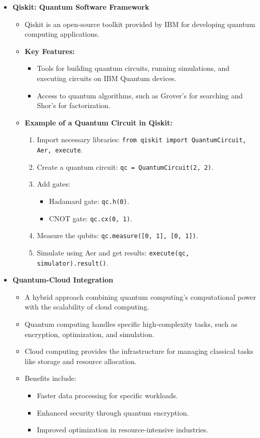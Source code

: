 \documentclass[12pt,a4paper]{article}
\begin{document}
\begin{itemize}
    \item \textbf{Qiskit: Quantum Software Framework}
    \begin{itemize}
        \item Qiskit is an open-source toolkit provided by IBM for developing quantum computing applications.
        \item \textbf{Key Features:}
        \begin{itemize}
            \item Tools for building quantum circuits, running simulations, and executing circuits on IBM Quantum devices.
            \item Access to quantum algorithms, such as Grover's for searching and Shor's for factorization.
        \end{itemize}
        \item \textbf{Example of a Quantum Circuit in Qiskit:}
        \begin{enumerate}
            \item Import necessary libraries: \texttt{from qiskit import QuantumCircuit, Aer, execute}.
            \item Create a quantum circuit: \texttt{qc = QuantumCircuit(2, 2)}.
            \item Add gates:
            \begin{itemize}
                \item Hadamard gate: \texttt{qc.h(0)}.
                \item CNOT gate: \texttt{qc.cx(0, 1)}.
            \end{itemize}
            \item Measure the qubits: \texttt{qc.measure([0, 1], [0, 1])}.
            \item Simulate using Aer and get results: \texttt{execute(qc, simulator).result()}.
        \end{enumerate}
    \end{itemize}

    \item \textbf{Quantum-Cloud Integration}
    \begin{itemize}
        \item A hybrid approach combining quantum computing's computational power with the scalability of cloud computing.
        \item Quantum computing handles specific high-complexity tasks, such as encryption, optimization, and simulation.
        \item Cloud computing provides the infrastructure for managing classical tasks like storage and resource allocation.
        \item Benefits include:
        \begin{itemize}
            \item Faster data processing for specific workloads.
            \item Enhanced security through quantum encryption.
            \item Improved optimization in resource-intensive industries.
        \end{itemize}
    \end{itemize}


\end{itemize}
\end{document}
